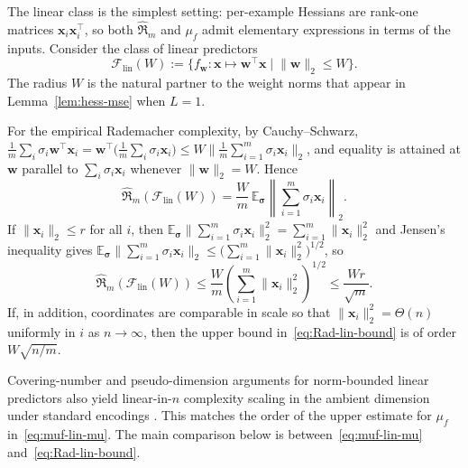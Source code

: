\documentclass[10pt,letterpaper]{article}
\theoremstyle{definition}
\begin{document}
The linear class is the simplest setting: per-example Hessians are rank-one matrices $\mathbf{x}_i\mathbf{x}_i^{\top}$, so both $\hat{\mathfrak{R}}_m$ and $\mu_f$ admit elementary expressions in terms of the inputs.
Consider the class of linear predictors
\begin{equation}\label{eq:F-lin}
  \mathcal{F}_{\mathrm{lin}}(W)
  := \bigl\{ f_{\mathbf{w}}:\mathbf{x}\mapsto \mathbf{w}^{\top}\mathbf{x} \;\big|\; \|\mathbf{w}\|_2\le W \bigr\}.
\end{equation}
The radius $W$ is the natural partner to the weight norms that appear in Lemma~\ref{lem:hess-mse} when $L=1$.

For the empirical Rademacher complexity, by Cauchy--Schwarz,
$\frac{1}{m}\sum_i \sigma_i \mathbf{w}^{\top}\mathbf{x}_i
= \mathbf{w}^{\top}\bigl(\frac{1}{m}\sum_i \sigma_i \mathbf{x}_i\bigr)
\le W \bigl\|\frac{1}{m}\sum_{i=1}^{m}\sigma_i \mathbf{x}_i\bigr\|_2$,
and equality is attained at $\mathbf{w}$ parallel to $\sum_i \sigma_i \mathbf{x}_i$ whenever $\|\mathbf{w}\|_2=W$.
Hence
\begin{equation}\label{eq:Rad-lin-exact}
  \hat{\mathfrak{R}}_m(\mathcal{F}_{\mathrm{lin}}(W))
  = \frac{W}{m}\,
  \mathbb{E}_{\boldsymbol{\sigma}}\left\|
    \sum_{i=1}^{m}\sigma_i \mathbf{x}_i
  \right\|_2 .
\end{equation}
If $\|\mathbf{x}_i\|_2\le r$ for all $i$, then
$\mathbb{E}_{\boldsymbol{\sigma}}\|\sum_{i=1}^{m}\sigma_i \mathbf{x}_i\|_2^2=\sum_{i=1}^{m}\|\mathbf{x}_i\|_2^2$
and Jensen's inequality gives
$\mathbb{E}_{\boldsymbol{\sigma}}\|\sum_{i=1}^{m}\sigma_i \mathbf{x}_i\|_2 \le \bigl(\sum_{i=1}^{m}\|\mathbf{x}_i\|_2^2\bigr)^{1/2}$,
so
\begin{equation}\label{eq:Rad-lin-bound}
  \hat{\mathfrak{R}}_m(\mathcal{F}_{\mathrm{lin}}(W))
  \le \frac{W}{m}\left(\sum_{i=1}^{m}\|\mathbf{x}_i\|_2^2\right)^{1/2}
  \le \frac{W r}{\sqrt{m}} .
\end{equation}
If, in addition, coordinates are comparable in scale so that $\|\mathbf{x}_i\|_2^2=\Theta(n)$ uniformly in $i$ as $n\to\infty$, then the upper bound in~\eqref{eq:Rad-lin-bound} is of order $W\sqrt{n/m}$.

Covering-number and pseudo-dimension arguments for norm-bounded linear predictors also yield linear-in-$n$ complexity scaling in the ambient dimension under standard encodings \cite{bartlett2002,vapnik1998}. This matches the order of the upper estimate for $\mu_f$ in~\eqref{eq:muf-lin-mu}. The main comparison below is between~\eqref{eq:muf-lin-mu} and~\eqref{eq:Rad-lin-bound}.
\end{document}
